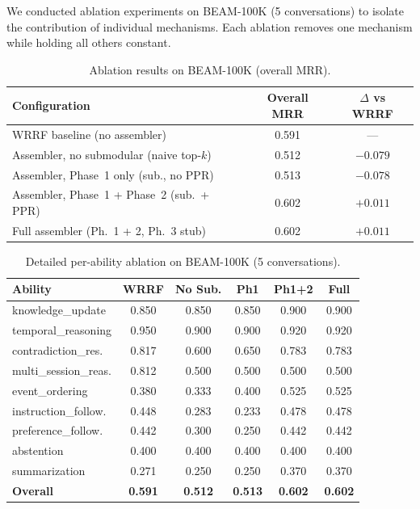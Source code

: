 \documentclass[11pt]{article}
\begin{document}
We conducted ablation experiments on BEAM-100K (5 conversations) to
isolate the contribution of individual mechanisms.  Each ablation
removes one mechanism while holding all others constant.

\begin{table}[t]
\centering
\caption{Ablation results on BEAM-100K (overall MRR).}
\label{tab:ablation-overall}
\begin{tabular}{lcc}
\toprule
Configuration & Overall MRR & $\Delta$ vs WRRF \\
\midrule
WRRF baseline (no assembler) & 0.591 & --- \\
Assembler, no submodular (naive top-$k$) & 0.512 & $-0.079$ \\
Assembler, Phase~1 only (sub., no PPR) & 0.513 & $-0.078$ \\
Assembler, Phase~1 + Phase~2 (sub.\ + PPR) & 0.602 & $+0.011$ \\
Full assembler (Ph.\ 1 + 2, Ph.\ 3 stub) & 0.602 & $+0.011$ \\
\bottomrule
\end{tabular}
\end{table}

\begin{table}[t]
\centering
\caption{Detailed per-ability ablation on BEAM-100K (5 conversations).}
\label{tab:ablation-detail}
\small
\begin{tabular}{lccccc}
\toprule
Ability & WRRF & No Sub. & Ph1 & Ph1+2 & Full \\
\midrule
knowledge\_update & 0.850 & 0.850 & 0.850 & 0.900 & 0.900 \\
temporal\_reasoning & 0.950 & 0.900 & 0.900 & 0.920 & 0.920 \\
contradiction\_res. & 0.817 & 0.600 & 0.650 & 0.783 & 0.783 \\
multi\_session\_reas. & 0.812 & 0.500 & 0.500 & 0.500 & 0.500 \\
event\_ordering & 0.380 & 0.333 & 0.400 & 0.525 & 0.525 \\
instruction\_follow. & 0.448 & 0.283 & 0.233 & 0.478 & 0.478 \\
preference\_follow. & 0.442 & 0.300 & 0.250 & 0.442 & 0.442 \\
abstention & 0.400 & 0.400 & 0.400 & 0.400 & 0.400 \\
summarization & 0.271 & 0.250 & 0.250 & 0.370 & 0.370 \\
\midrule
\textbf{Overall} & \textbf{0.591} & \textbf{0.512} & \textbf{0.513} & \textbf{0.602} & \textbf{0.602} \\
\bottomrule
\end{tabular}
\end{table}
\end{document}
